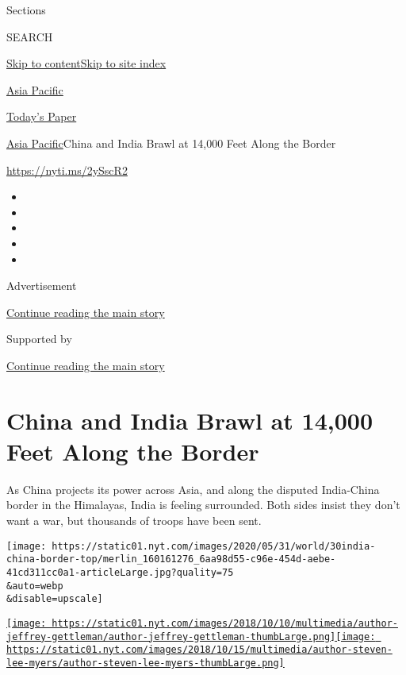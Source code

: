 Sections

SEARCH

\protect\hyperlink{site-content}{Skip to
content}\protect\hyperlink{site-index}{Skip to site index}

\href{https://www.nytimes.com/section/world/asia}{Asia Pacific}

\href{https://myaccount.nytimes.com/auth/login?response_type=cookie\&client_id=vi}{}

\href{https://www.nytimes.com/section/todayspaper}{Today's Paper}

\href{/section/world/asia}{Asia Pacific}\textbar{}China and India Brawl
at 14,000 Feet Along the Border

\url{https://nyti.ms/2ySscR2}

\begin{itemize}
\item
\item
\item
\item
\item
\end{itemize}

Advertisement

\protect\hyperlink{after-top}{Continue reading the main story}

Supported by

\protect\hyperlink{after-sponsor}{Continue reading the main story}

\hypertarget{china-and-india-brawl-at-14000-feet-along-the-border}{%
\section{China and India Brawl at 14,000 Feet Along the
Border}\label{china-and-india-brawl-at-14000-feet-along-the-border}}

As China projects its power across Asia, and along the disputed
India-China border in the Himalayas, India is feeling surrounded. Both
sides insist they don't want a war, but thousands of troops have been
sent.

\texttt{[image: https://static01.nyt.com/images/2020/05/31/world/30india-china-border-top/merlin\_160161276\_6aa98d55-c96e-454d-aebe-41cd311cc0a1-articleLarge.jpg?quality=75\\\&auto=webp\\\&disable=upscale]}

\href{https://www.nytimes.com/by/jeffrey-gettleman}{\texttt{[image: https://static01.nyt.com/images/2018/10/10/multimedia/author-jeffrey-gettleman/author-jeffrey-gettleman-thumbLarge.png]}}\href{https://www.nytimes.com/by/steven-lee-myers}{\texttt{[image: https://static01.nyt.com/images/2018/10/15/multimedia/author-steven-lee-myers/author-steven-lee-myers-thumbLarge.png]}}

